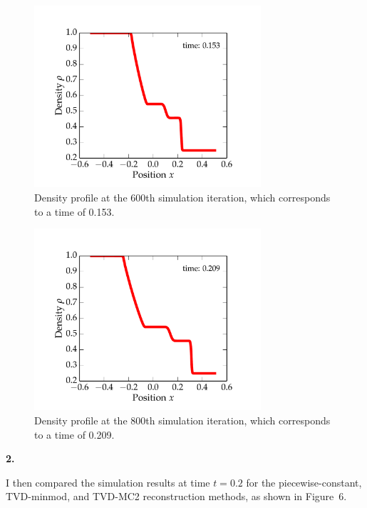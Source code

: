 \documentclass{article}
\begin{document}
\begin{spacing}{1.1}
\begin{figure}[H]
 \centering
 \hspace{0cm} \includegraphics[width=0.75\textwidth]{figs-pc/600.pdf}
 \caption{Density profile at the 600th simulation iteration, which corresponds to a time of 0.153.}
\end{figure} 

\begin{figure}[H]
 \centering
 \hspace{0cm} \includegraphics[width=0.75\textwidth]{figs-pc/800.pdf}
 \caption{Density profile at the 800th simulation iteration, which corresponds to a time of 0.209.}
\end{figure} 

\newpage
\noindent \textbf{2.}

I then compared the simulation results at time \(t = 0.2\) for the piecewise-constant, TVD-minmod, and TVD-MC2 reconstruction methods, as shown in Figure~6.


\end{spacing}
\end{document}
